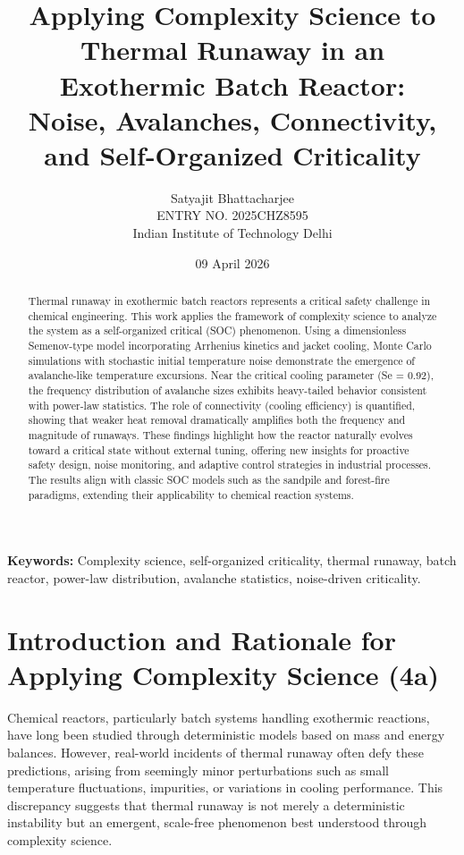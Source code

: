 \documentclass[11pt,a4paper]{article}
\title{Applying Complexity Science to Thermal Runaway in an Exothermic Batch Reactor: \\ Noise, Avalanches, Connectivity, and Self-Organized Criticality}
\author{Satyajit Bhattacharjee \\ ENTRY NO. 2025CHZ8595 \\ Indian Institute of Technology Delhi\\}
\date{09 April 2026}
\begin{document}
\maketitle

\begin{abstract}
Thermal runaway in exothermic batch reactors represents a critical safety challenge in chemical engineering. This work applies the framework of complexity science to analyze the system as a self-organized critical (SOC) phenomenon. Using a dimensionless Semenov-type model incorporating Arrhenius kinetics and jacket cooling, Monte Carlo simulations with stochastic initial temperature noise demonstrate the emergence of avalanche-like temperature excursions. Near the critical cooling parameter (Se = 0.92), the frequency distribution of avalanche sizes exhibits heavy-tailed behavior consistent with power-law statistics. The role of connectivity (cooling efficiency) is quantified, showing that weaker heat removal dramatically amplifies both the frequency and magnitude of runaways. These findings highlight how the reactor naturally evolves toward a critical state without external tuning, offering new insights for proactive safety design, noise monitoring, and adaptive control strategies in industrial processes. The results align with classic SOC models such as the sandpile and forest-fire paradigms, extending their applicability to chemical reaction systems.
\end{abstract}

\textbf{Keywords:} Complexity science, self-organized criticality, thermal runaway, batch reactor, power-law distribution, avalanche statistics, noise-driven criticality.

\section{Introduction and Rationale for Applying Complexity Science (4a)}
\label{sec:intro}

Chemical reactors, particularly batch systems handling exothermic reactions, have long been studied through deterministic models based on mass and energy balances. However, real-world incidents of thermal runaway often defy these predictions, arising from seemingly minor perturbations such as small temperature fluctuations, impurities, or variations in cooling performance. This discrepancy suggests that thermal runaway is not merely a deterministic instability but an emergent, scale-free phenomenon best understood through complexity science.
\end{document}
